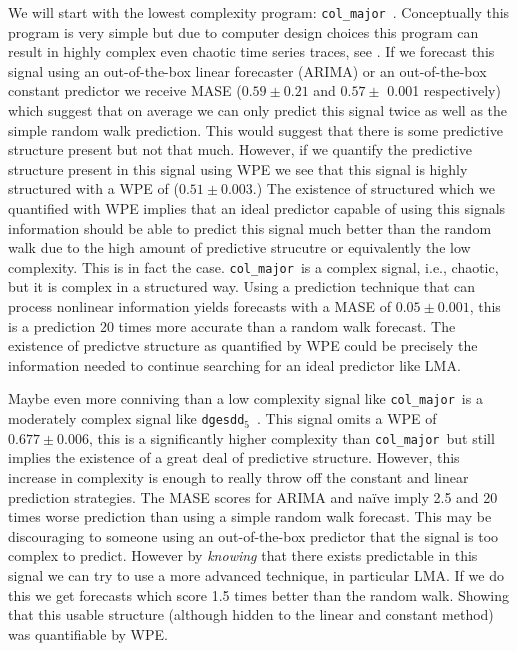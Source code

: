 \documentclass{article}
\newcommand{\svdfive}{{\tt dgesdd$_5$}~}
\newcommand{\col}{{\tt col\_major}~}
\begin{document}
We will start with the lowest complexity program: \col. Conceptually this program is very simple but due to computer design choices this program can result in highly complex even chaotic time series traces, see \cite{toddchaos}. If we forecast this signal using an out-of-the-box linear forecaster (ARIMA) or an out-of-the-box constant predictor we receive MASE ($0.59 \pm 0.21$ and $0.57 \pm$ 0.001 respectively) which suggest that on average we can only predict this signal twice as well as the simple random walk prediction. This would suggest that there is some predictive structure present but not that much. However, if we quantify the predictive structure present in this signal using WPE we see that this signal is highly structured with a WPE of ($0.51 \pm 0.003$.) The existence of structured which we quantified with WPE implies that an ideal predictor capable of using this signals information should be able to predict this signal much better than the random walk due to the high amount of predictive strucutre or equivalently the low complexity. This is in fact the case. \col is a complex signal, i.e., chaotic, but it is complex in a structured way. Using a prediction technique that can process nonlinear information yields forecasts with a MASE of $0.05 \pm 0.001$, this is a prediction 20 times more accurate than a random walk forecast. The existence of predictve structure as quantified by WPE could be precisely the information needed to continue searching for an ideal predictor like LMA. 

Maybe even more conniving than a low complexity signal like \col is a moderately complex signal like \svdfive. This signal omits a WPE of $0.677 \pm 0.006$, this is a significantly higher complexity than \col but still implies the existence of a great deal of predictive structure. However, this increase in complexity is enough to really throw off the constant and linear prediction strategies. The MASE scores for ARIMA and na\"ive imply 2.5 and 20 times worse prediction than using a simple random walk forecast. This may be discouraging to someone using an out-of-the-box predictor that the signal is too complex to predict. However by \emph{knowing} that there exists predictable  in this signal we can try to use a more advanced technique, in particular LMA. If we do this we get forecasts which score 1.5 times better than the random walk. Showing that this usable structure (although hidden to the linear and constant method) was quantifiable by WPE.
\end{document}

